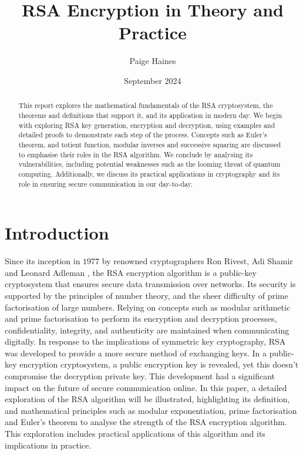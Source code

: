 \documentclass{article}
\title{RSA Encryption in Theory and Practice}
\author{Paige Haines}
\date{September 2024}
\begin{document}
\maketitle
\begin{abstract}
    This report explores the mathematical fundamentals of the RSA cryptosystem, the theorems and definitions that support it, and its application in modern day. We begin with exploring RSA key generation, encryption and decryption, using examples and detailed proofs to demonstrate each step of the process. Concepts such as Euler's theorem, and totient function, modular inverses and successive squaring are discussed to emphasise their roles in the RSA algorithm. We conclude by analysing its vulnerabilities, including potential weaknesses such as the looming threat of quantum computing. Additionally, we discuss its practical applications in cryptography and its role in ensuring secure communication in our day-to-day.
\end{abstract}

\section{Introduction}
Since its inception in $1977$ by renowned cryptographers Ron Rivest, Adi Shamir and Leonard Adleman \cite{rsa1977}, the RSA encryption algorithm is a public-key cryptosystem that ensures secure data transmission over networks. Its security is supported by the principles of number theory, and the sheer difficulty of prime factorisation of large numbers.  Relying on concepts such as modular arithmetic and prime factorisation to perform its encryption and decryption processes, confidentiality, integrity, and authenticity are maintained when communicating digitally. In response to the implications of symmetric key cryptography, RSA was developed to provide a more secure method of exchanging keys. In a public-key encryption cryptosystem, a public encryption key is revealed, yet this doesn't compromise the decryption private key. This development had a significant impact on the future of secure communication online. In this paper, a detailed exploration of the RSA algorithm will be illustrated, highlighting its definition, and mathematical principles such as modular exponentiation, prime factorisation and Euler's theorem to analyse the strength of the RSA encryption algorithm. This exploration includes practical applications of this algorithm and its implications in practice. 
\end{document}
